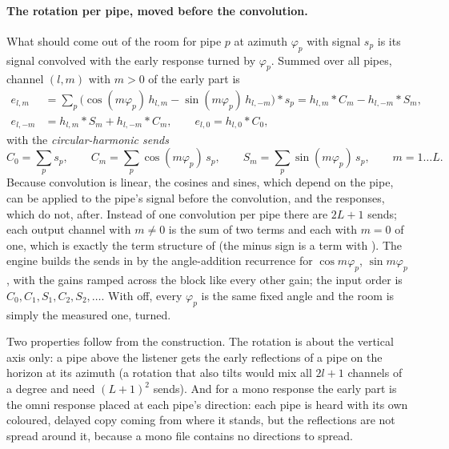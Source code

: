 \paragraph{The rotation per pipe, moved before the convolution.} What should come out of the room for pipe $p$ at
azimuth $\varphi_p$ with signal $s_p$ is its signal convolved with the early response turned by $\varphi_p$. Summed over
all pipes, channel $(l,m)$ with $m>0$ of the early part is
\begin{align}
  e_{l,m} &= \sum_p \bigl(\cos(m\varphi_p)\,h_{l,m} - \sin(m\varphi_p)\,h_{l,-m}\bigr) * s_p
           = h_{l,m} * C_m - h_{l,-m} * S_m, \\
  e_{l,-m} &= h_{l,m} * S_m + h_{l,-m} * C_m,\qquad e_{l,0} = h_{l,0} * C_0,
\end{align}
with the \emph{circular-harmonic sends}
\begin{equation}
  C_0 = \sum_p s_p,\qquad C_m = \sum_p \cos(m\varphi_p)\,s_p,\qquad S_m = \sum_p \sin(m\varphi_p)\,s_p,\qquad m = 1\dots L.
\end{equation}
Because convolution is linear, the cosines and sines, which depend on the pipe, can be applied to the pipe's
signal before the convolution, and the responses, which do not, after. Instead of one convolution per pipe there are
$2L+1$ sends; each output channel with $m\neq0$ is the sum of two terms and each with $m=0$ of one, which is exactly
the term structure of  (the minus sign is a term with ). The engine builds
the sends in  by the angle-addition recurrence for $\cos m\varphi_p$, $\sin m\varphi_p$, with the gains
ramped across the block like every other gain; the input order is $C_0, C_1, S_1, C_2, S_2,\dots$. With  off, every $\varphi_p$ is the same fixed angle and the room is simply the measured one, turned.

Two properties follow from the construction. The rotation is about the vertical axis only: a pipe above the listener
gets the early reflections of a pipe on the horizon at its azimuth (a rotation that also tilts would mix all
$2l+1$ channels of a degree and need $(L+1)^2$ sends). And for a mono response the early part is the omni response
placed at each pipe's direction: each pipe is heard with its own coloured, delayed copy coming from where it stands,
but the reflections are not spread around it, because a mono file contains no directions to spread.

